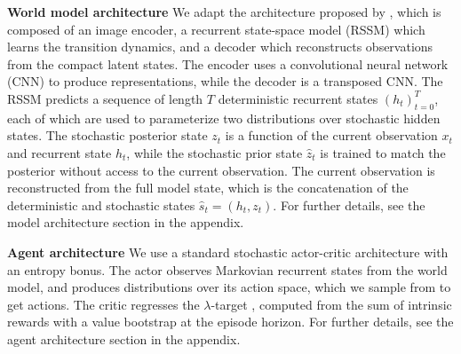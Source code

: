 \documentclass[10pt]{article} %
\DeclarePairedDelimiter{\norm}{\lVert}{\rVert}
\theoremstyle{plain}
\theoremstyle{definition}
\theoremstyle{remark}
\begin{document}
\textbf{World model architecture} \hspace{0.3cm} We adapt the architecture proposed by \citet{dreamerv2}, which is composed of an image encoder, a recurrent state-space model (RSSM) which learns the transition dynamics, and a decoder which reconstructs observations from the compact latent states. The encoder uses a convolutional neural network (CNN) to produce representations, while the decoder is a transposed CNN. The RSSM predicts a sequence of length $T$ deterministic recurrent states $(h_t)_{t=0}^T$, each of which are used to parameterize two distributions over stochastic hidden states. The stochastic posterior state $z_t$ is a function of the current observation $x_t$ and recurrent state $h_t$, while the stochastic prior state $\hat{z}_t$ is trained to match the posterior without access to the current observation. The current observation is reconstructed from the full model state, which is the concatenation of the deterministic and stochastic states $\hat{s}_t = (h_t, z_t)$. For further details, see the model architecture section in the appendix.


\textbf{Agent architecture}\hspace{0.3cm} We use a standard stochastic actor-critic architecture with an entropy bonus. The actor observes Markovian recurrent states from the world model, and produces distributions over its action space, which we sample from to get actions. The critic regresses the $\lambda$-target \citep{suttonbarto}, computed from the sum of intrinsic rewards with a value bootstrap at the episode horizon. For further details, see the agent architecture section in the appendix.
\end{document}
